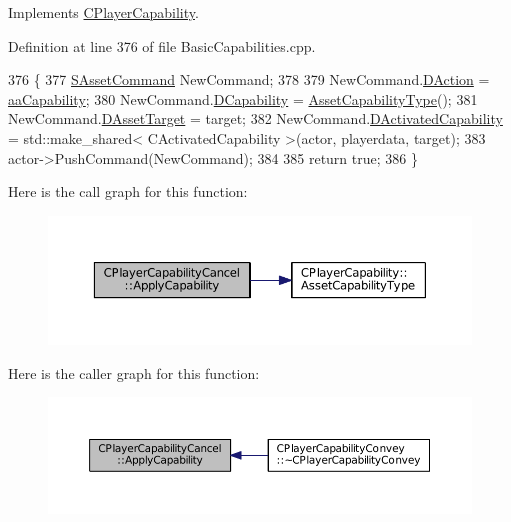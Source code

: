 Implements \hyperlink{classCPlayerCapability_a2ca6fd7fbd9c0178f1cf1d049c63825f}{C\+Player\+Capability}.



Definition at line 376 of file Basic\+Capabilities.\+cpp.


\begin{DoxyCode}
376                                                                                                            
                                                          \{
377     \hyperlink{structSAssetCommand}{SAssetCommand} NewCommand;
378     
379     NewCommand.\hyperlink{structSAssetCommand_a8edd3b3d59a76d5514ba403bc8076a75}{DAction} = \hyperlink{GameDataTypes_8h_ab47668e651a3032cfb9c40ea2d60d670acf9fb164e8abd71c71f4a8c7fda360d4}{aaCapability};
380     NewCommand.\hyperlink{structSAssetCommand_a734ea7c6847457b437360f333f570ff9}{DCapability} = \hyperlink{classCPlayerCapability_a433bb196cd6ab6a932f1cac102b3aa98}{AssetCapabilityType}();
381     NewCommand.\hyperlink{structSAssetCommand_a3d9b43f6e59c386c48c41a65448a0c39}{DAssetTarget} = target;
382     NewCommand.\hyperlink{structSAssetCommand_ad8beda19520811cc70fe1eab16c774dd}{DActivatedCapability} = std::make\_shared< CActivatedCapability >(actor, 
      playerdata, target);
383     actor->PushCommand(NewCommand);
384 
385     \textcolor{keywordflow}{return} \textcolor{keyword}{true};
386 \}
\end{DoxyCode}
Here is the call graph for this function\+:\nopagebreak
\begin{figure}[H]
\begin{center}
\leavevmode
\includegraphics[width=350pt]{classCPlayerCapabilityCancel_a8f738ac375bf5d1e7f8b768bce16b946_cgraph}
\end{center}
\end{figure}
Here is the caller graph for this function\+:\nopagebreak
\begin{figure}[H]
\begin{center}
\leavevmode
\includegraphics[width=350pt]{classCPlayerCapabilityCancel_a8f738ac375bf5d1e7f8b768bce16b946_icgraph}
\end{center}
\end{figure}
\hypertarget{classCPlayerCapabilityCancel_a0221e4e768c998cb46f1dbc757647ec1}{}\label{classCPlayerCapabilityCancel_a0221e4e768c998cb46f1dbc757647ec1} 
